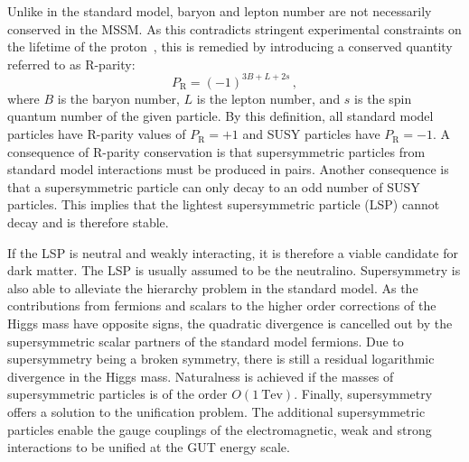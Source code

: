 Unlike in the standard model, baryon and lepton number are not necessarily 
conserved in the MSSM. As this contradicts stringent experimental constraints 
on the lifetime of the proton~\cite{proton-decay}, this is remedied by 
introducing a conserved quantity referred to as R-parity:
\begin{equation}
P_{\mathrm R} = (-1)^{3B+L+2s} \, ,
\end{equation}
where $B$ is the baryon number, $L$ is the lepton number, and $s$ is the spin 
quantum number of the given particle. By this definition, all standard model 
particles have R-parity values of $P_{\mathrm R} = +1$ and SUSY particles have 
$P_{\mathrm R} = -1$. A consequence of R-parity conservation is that 
supersymmetric particles from standard model interactions must be produced in 
pairs. Another consequence is that a supersymmetric particle can only decay to 
an odd number of SUSY particles. This implies that the lightest supersymmetric 
particle (LSP) cannot decay and is therefore stable.

If the LSP is neutral and weakly interacting, 
it is therefore a viable candidate for dark matter. The LSP is usually assumed 
to be the neutralino. 
Supersymmetry is also able to alleviate the hierarchy problem in the standard 
model. As the 
contributions from fermions and scalars to the higher order corrections of the 
Higgs mass have opposite signs, the quadratic divergence is cancelled out by 
the supersymmetric scalar partners of the standard model fermions. Due to 
supersymmetry being a broken symmetry, there is still a residual logarithmic 
divergence in the Higgs mass. Naturalness is achieved if the masses of 
supersymmetric particles is of the order $O(1~\mathrm{Tev})$. 
Finally, supersymmetry offers a solution to the unification problem. The 
additional supersymmetric particles enable the gauge couplings of the 
electromagnetic, weak and strong interactions to be unified at the GUT energy 
scale.

